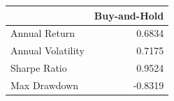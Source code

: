 \begin{tabular}{lr}
\toprule
 & Buy-and-Hold \\
\midrule
Annual Return & 0.6834 \\
Annual Volatility & 0.7175 \\
Sharpe Ratio & 0.9524 \\
Max Drawdown & -0.8319 \\
\bottomrule
\end{tabular}
